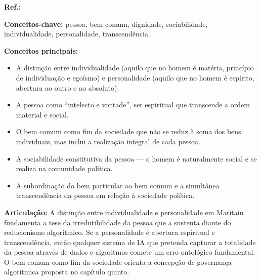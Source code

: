 \begin{fichamento}
    \textbf{Ref.:} \cite{Maritain1947PCG}
    
    \textbf{Conceitos-chave:} pessoa, bem comum, dignidade, sociabilidade, individualidade, personalidade, transcendência.
    
    \textbf{Conceitos principais:}
    \begin{itemize}
        \item A distinção entre individualidade (aquilo que no homem é matéria, princípio de individuação e egoísmo) e personalidade (aquilo que no homem é espírito, abertura ao outro e ao absoluto).
        \item A pessoa como ``intelecto e vontade'', ser espiritual que transcende a ordem material e social.
        \item O bem comum como fim da sociedade que não se reduz à soma dos bens individuais, mas inclui a realização integral de cada pessoa.
        \item A sociabilidade constitutiva da pessoa — o homem é naturalmente social e se realiza na comunidade política.
        \item A subordinação do bem particular ao bem comum e a simultânea transcendência da pessoa em relação à sociedade política.
    \end{itemize}
    
    \textbf{Articulação:} A distinção entre individualidade e personalidade em Maritain fundamenta a tese da irredutibilidade da pessoa que a \MH{} sustenta diante do reducionismo algorítmico. Se a personalidade é abertura espiritual e transcendência, então qualquer sistema de IA que pretenda capturar a totalidade da pessoa através de dados e algoritmos comete um erro ontológico fundamental. O bem comum como fim da sociedade orienta a concepção de governança algorítmica proposta no capítulo quinto.
\end{fichamento}

